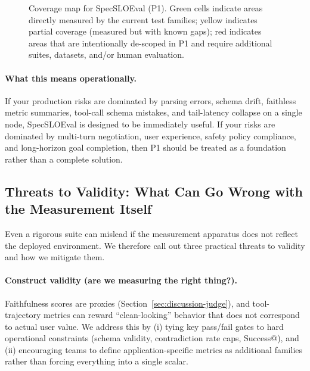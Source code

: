 \begin{figure}[t]
    \caption{Coverage map for SpecSLOEval (P1). Green cells indicate areas directly measured by the current test families; yellow indicates partial coverage (measured but with known gaps); red indicates areas that are intentionally de-scoped in P1 and require additional suites, datasets, and/or human evaluation.}
    \label{fig:coverage-map}
\end{figure}

\paragraph{What this means operationally.}
If your production risks are dominated by parsing errors, schema drift, faithless metric summaries, tool-call schema mistakes, and tail-latency collapse on a single node, SpecSLOEval is designed to be immediately useful.
If your risks are dominated by multi-turn negotiation, user experience, safety policy compliance, and long-horizon goal completion, then P1 should be treated as a foundation rather than a complete solution.

\subsection{Threats to Validity: What Can Go Wrong with the Measurement Itself}

Even a rigorous suite can mislead if the measurement apparatus does not reflect the deployed environment.
We therefore call out three practical threats to validity and how we mitigate them.

\paragraph{Construct validity (are we measuring the right thing?).}
Faithfulness scores are proxies (Section~\ref{sec:discussion-judge}), and tool-trajectory metrics can reward ``clean-looking'' behavior that does not correspond to actual user value.
We address this by (i) tying key pass/fail gates to hard operational constraints (schema validity, contradiction rate caps, Success@\slo), and (ii) encouraging teams to define application-specific metrics as additional families rather than forcing everything into a single scalar.

